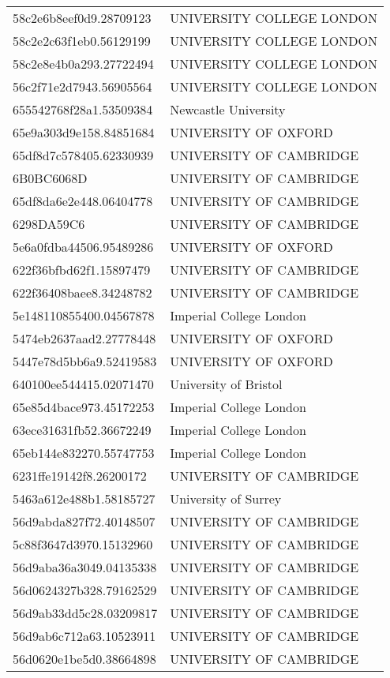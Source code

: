 \begin{tabular}{ll}
58c2e6b8eef0d9.28709123 & UNIVERSITY COLLEGE LONDON \\
58c2e2c63f1eb0.56129199 & UNIVERSITY COLLEGE LONDON \\
58c2e8e4b0a293.27722494 & UNIVERSITY COLLEGE LONDON \\
56c2f71e2d7943.56905564 & UNIVERSITY COLLEGE LONDON \\
655542768f28a1.53509384 & Newcastle University \\
65e9a303d9e158.84851684 & UNIVERSITY OF OXFORD \\
65df8d7c578405.62330939 & UNIVERSITY OF CAMBRIDGE \\
6B0BC6068D & UNIVERSITY OF CAMBRIDGE \\
65df8da6e2e448.06404778 & UNIVERSITY OF CAMBRIDGE \\
6298DA59C6 & UNIVERSITY OF CAMBRIDGE \\
5e6a0fdba44506.95489286 & UNIVERSITY OF OXFORD \\
622f36bfbd62f1.15897479 & UNIVERSITY OF CAMBRIDGE \\
622f36408baee8.34248782 & UNIVERSITY OF CAMBRIDGE \\
5e148110855400.04567878 & Imperial College London \\
5474eb2637aad2.27778448 & UNIVERSITY OF OXFORD \\
5447e78d5bb6a9.52419583 & UNIVERSITY OF OXFORD \\
640100ee544415.02071470 & University of Bristol \\
65e85d4bace973.45172253 & Imperial College London \\
63ece31631fb52.36672249 & Imperial College London \\
65eb144e832270.55747753 & Imperial College London \\
6231ffe19142f8.26200172 & UNIVERSITY OF CAMBRIDGE \\
5463a612e488b1.58185727 & University of Surrey \\
56d9abda827f72.40148507 & UNIVERSITY OF CAMBRIDGE \\
5c88f3647d3970.15132960 & UNIVERSITY OF CAMBRIDGE \\
56d9aba36a3049.04135338 & UNIVERSITY OF CAMBRIDGE \\
56d0624327b328.79162529 & UNIVERSITY OF CAMBRIDGE \\
56d9ab33dd5c28.03209817 & UNIVERSITY OF CAMBRIDGE \\
56d9ab6c712a63.10523911 & UNIVERSITY OF CAMBRIDGE \\
56d0620e1be5d0.38664898 & UNIVERSITY OF CAMBRIDGE \\

\end{tabular}
